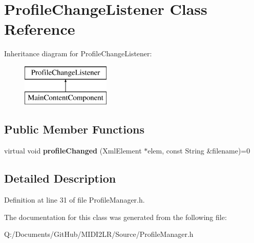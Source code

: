 \hypertarget{class_profile_change_listener}{}\section{Profile\+Change\+Listener Class Reference}
\label{class_profile_change_listener}
Inheritance diagram for Profile\+Change\+Listener\+:\begin{figure}[H]
\begin{center}
\leavevmode
\includegraphics[height=2.000000cm]{class_profile_change_listener}
\end{center}
\end{figure}
\subsection*{Public Member Functions}
\begin{DoxyCompactItemize}
\item 
virtual void {\bfseries profile\+Changed} (Xml\+Element $\ast$elem, const String \&filename)=0\hypertarget{class_profile_change_listener_a73fd7f608cfd6f31ac1dc8d7d1da5756}{}\label{class_profile_change_listener_a73fd7f608cfd6f31ac1dc8d7d1da5756}

\end{DoxyCompactItemize}


\subsection{Detailed Description}


Definition at line 31 of file Profile\+Manager.\+h.



The documentation for this class was generated from the following file\+:\begin{DoxyCompactItemize}
\item 
Q\+:/\+Documents/\+Git\+Hub/\+M\+I\+D\+I2\+L\+R/\+Source/Profile\+Manager.\+h\end{DoxyCompactItemize}
